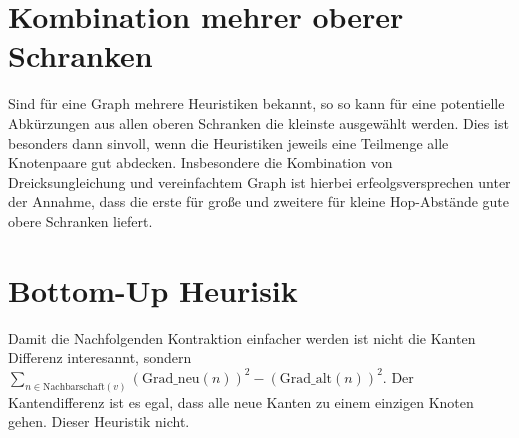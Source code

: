 \section{Kombination mehrer oberer Schranken}
Sind für eine Graph mehrere Heuristiken bekannt, so so kann für eine potentielle Abkürzungen aus allen oberen Schranken die kleinste ausgewählt werden.
Dies ist besonders dann sinvoll, wenn die Heuristiken jeweils eine Teilmenge alle Knotenpaare gut abdecken.
Insbesondere die Kombination von Dreicksungleichung und vereinfachtem Graph ist hierbei erfeolgsversprechen unter der Annahme, dass die erste für große und zweitere für kleine Hop-Abstände gute obere Schranken liefert.

\section{Bottom-Up Heurisik}

Damit die Nachfolgenden Kontraktion einfacher werden ist nicht die Kanten Differenz interesannt, sondern $\sum_{n \in \text{Nachbarschaft}(v)} (\text{Grad\_neu}(n))^2 - (\text{Grad\_alt}(n))^2$.
Der Kantendifferenz ist es egal, dass alle neue Kanten zu einem einzigen Knoten gehen. Dieser Heuristik nicht.

